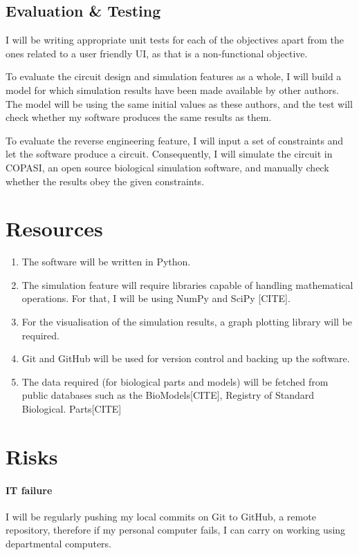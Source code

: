 \documentclass{article}
\begin{document}
	\subsection{Evaluation \& Testing}
	\par I will be writing appropriate unit tests for each of the objectives apart from the ones related to a user friendly UI, as that is a non-functional objective.
	\par To evaluate the circuit design and simulation features as a whole, I will build a model for which simulation results have been made available by other authors. The model will be using the same initial values as these authors, and the test will check whether my software produces the same results as them. 
	\par To evaluate the reverse engineering feature, I will input a set of constraints and let the software produce a circuit. Consequently, I will simulate the circuit in COPASI, an open source biological simulation software, and manually check whether the results obey the given constraints.
	
	\section{Resources}
	\begin{enumerate}
		\item The software will be written in Python.
		\item The simulation feature will require libraries capable of handling mathematical operations. For that, I will be using NumPy and SciPy [CITE].
		\item For the visualisation of the simulation results, a graph plotting library will be required.
		\item Git and GitHub will be used for version control and backing up the software.
		\item The data required (for biological parts and models) will be fetched from public databases such as the BioModels[CITE], Registry of Standard Biological. Parts[CITE]
	\end{enumerate}

	\section{Risks}
	\paragraph{IT failure} I will be regularly pushing my local commits on Git to GitHub, a remote repository, therefore if my personal computer fails, I can carry on working using departmental computers.
\end{document}
